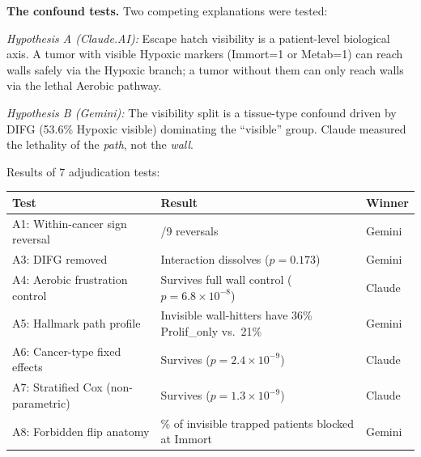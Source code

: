 \documentclass[
  11pt,
]{article}
\newcounter{none} %
\begin{document}
\textbf{The confound tests.} Two competing explanations were tested:

\emph{Hypothesis A (Claude.AI):} Escape hatch visibility is a
patient-level biological axis. A tumor with visible Hypoxic markers
(Immort=1 or Metab=1) can reach walls safely via the Hypoxic branch; a
tumor without them can only reach walls via the lethal Aerobic pathway.

\emph{Hypothesis B (Gemini):} The visibility split is a tissue-type
confound driven by DIFG (53.6\% Hypoxic visible) dominating the
``visible'' group. Claude measured the lethality of the \emph{path}, not
the \emph{wall}.

Results of 7 adjudication tests:

{\def\LTcaptype{none} %
\begin{longtable}[]{@{}
  >{\raggedright\arraybackslash}p{}
  >{\raggedright\arraybackslash}p{}
  >{\raggedright\arraybackslash}p{}@{}}
\toprule\noalign{}
\begin{minipage}[b]{\linewidth}\raggedright
Test
\end{minipage} & \begin{minipage}[b]{\linewidth}\raggedright
Result
\end{minipage} & \begin{minipage}[b]{\linewidth}\raggedright
Winner
\end{minipage} \\
\midrule\noalign{}
\endhead
\bottomrule\noalign{}
\endlastfoot
A1: Within-cancer sign reversal & 3/9 reversals & Gemini \\
A3: DIFG removed & Interaction dissolves (\(p = 0.173\)) & Gemini \\
A4: Aerobic frustration control & Survives full wall control
(\(p = 6.8 \times 10^{-8}\)) & Claude \\
A5: Hallmark path profile & Invisible wall-hitters have 36\%
Prolif\_only vs.~21\% & Gemini \\
A6: Cancer-type fixed effects & Survives (\(p = 2.4 \times 10^{-9}\)) &
Claude \\
A7: Stratified Cox (non-parametric) & Survives
(\(p = 1.3 \times 10^{-9}\)) & Claude \\
A8: Forbidden flip anatomy & 100\% of invisible trapped patients blocked
at Immort & Gemini \\
\end{longtable}
}
\end{document}
